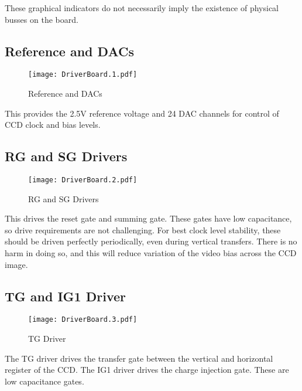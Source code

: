 \documentclass[a4paper,12pt]{article}
\begin{document}
These graphical indicators do not necessarily imply the existence of physical busses on the board.

\subsection{Reference and DACs}
   \begin{figure}
   \begin{center}
   \texttt{[image: DriverBoard.1.pdf]}
   \end{center}
   \caption{Reference and DACs}
   \end{figure}
   
This provides the 2.5V reference voltage and 24 DAC channels for control of CCD clock and bias levels.
  

\subsection{RG and SG Drivers}
   \begin{figure}
   \begin{center}
   \texttt{[image: DriverBoard.2.pdf]}
   \end{center}
   \caption{RG and SG Drivers}
   \end{figure}

This drives the reset gate and summing gate. These gates have low capacitance, so drive requirements are not challenging. For best clock level stability, these should be driven perfectly periodically, even during vertical transfers. There is no harm in doing so, and this will reduce variation of the video bias across the CCD image.
  

\subsection{TG and IG1 Driver}
   \begin{figure}
   \begin{center}
   \texttt{[image: DriverBoard.3.pdf]}
   \end{center}
   \caption{TG Driver}
   \end{figure}
   
The TG driver drives the transfer gate between the vertical and horizontal register of the CCD. The IG1 driver drives the charge injection gate. These are low capacitance gates.
  
\end{document}
